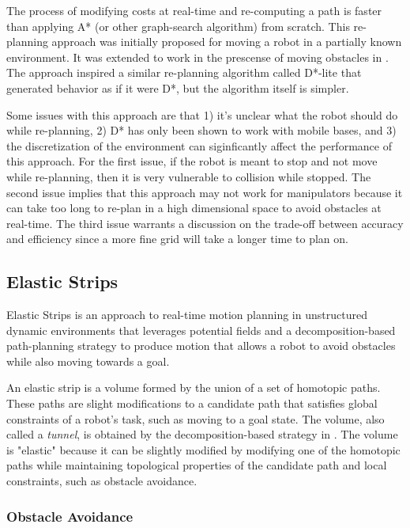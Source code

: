 \documentclass[10pt,conference]{ieeeconf}
\begin{document}
The process of modifying costs at real-time and re-computing a path is faster than applying A* (or other graph-search algorithm) from scratch. This re-planning approach was initially proposed for moving a robot in a partially known environment. It was extended to work in the prescense of moving obstacles in \cite{stentz1995focussed}. The approach inspired a similar re-planning algorithm called D*-lite \cite{koenig2005fast} that generated behavior as if it were D*, but the algorithm itself is simpler. 

Some issues with this approach are that 1) it's unclear what the robot should do while re-planning, 2) D* has only been shown to work with mobile bases, and 3) the discretization of the environment can siginficantly affect the performance of this approach. For the first issue, if the robot is meant to stop and not move while re-planning, then it is very vulnerable to collision while stopped. The second issue implies that this approach may not work for manipulators because it can take too long to re-plan in a high dimensional space to avoid obstacles at real-time. The third issue warrants a discussion on the trade-off between accuracy and efficiency since a more fine grid will take a longer time to plan on. 



\subsection{Elastic Strips} \label{sec:elastic}

Elastic Strips \cite{brock2002elastic} is an approach to real-time motion planning in unstructured dynamic environments that leverages potential fields and a decomposition-based path-planning strategy \cite{brock2001decomposition} to produce motion that allows a robot to avoid obstacles while also moving towards a goal.

An elastic strip is a volume formed by the union of a set of homotopic paths. These paths are slight modifications to a candidate path that satisfies global constraints of a robot's task, such as moving to a goal state. The volume, also called a \emph{tunnel}, is obtained by the decomposition-based strategy in \cite{brock2001decomposition}. The volume is "elastic" because it can be slightly modified by modifying one of the homotopic paths while maintaining topological properties of the candidate path and local constraints, such as obstacle avoidance. 


\subsubsection{Obstacle Avoidance}
\end{document}
